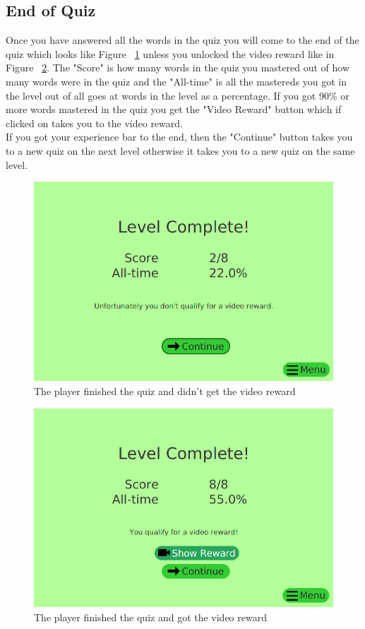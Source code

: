 \documentclass[12pt,a4paper,titlepage,onecolumn]{article}
\begin{document}
	\subsection{End of Quiz}
	Once you have answered all the words in the quiz you will come to the end of the quiz which looks like Figure ~\ref{fig:NewQuizEndNoReward} unless you unlocked the video reward like in Figure ~\ref{fig:NewQuizEndReward}. The "Score" is how many words in the quiz you mastered out of how many words were in the quiz and the "All-time" is all the mastereds you got in the level out of all goes at words in the level as a percentage. If you got 90\% or more words mastered in the quiz you get the "Video Reward" button which if clicked on takes you to the video reward.\\ If you got your experience bar to the end, then the "Continue" button takes you to a new quiz on the next level otherwise it takes you to a new quiz on the same level.
	\begin{figure}[h]
		\centering
		\includegraphics[width=1\linewidth]{Figures/NewQuiz/NewQuizEndNoReward}
		\caption[Quiz End without Reward]{The player finished the quiz and didn't get the video reward}
		\label{fig:NewQuizEndNoReward}
	\end{figure}
	\begin{figure}[h]
		\centering
		\includegraphics[width=1\linewidth]{Figures/NewQuiz/NewQuizEndReward}
		\caption[Quiz End with Reward]{The player finished the quiz and got the video reward}
		\label{fig:NewQuizEndReward}
	\end{figure}
\end{document}
